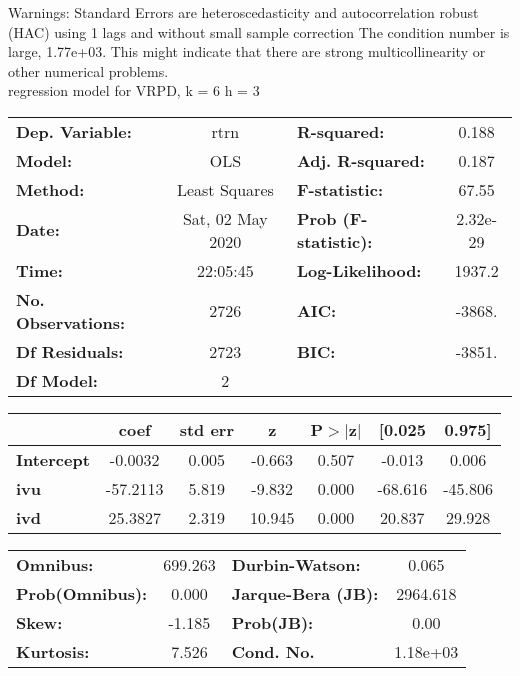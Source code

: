 Warnings: \newline
 [1] Standard Errors are heteroscedasticity and autocorrelation robust (HAC) using 1 lags and without small sample correction \newline
 [2] The condition number is large, 1.77e+03. This might indicate that there are \newline
 strong multicollinearity or other numerical problems.\\ 

regression model for VRPD, k = 6 h = 3\begin{center}
\begin{tabular}{lclc}
\toprule
\textbf{Dep. Variable:}    &       rtrn       & \textbf{  R-squared:         } &     0.188   \\
\textbf{Model:}            &       OLS        & \textbf{  Adj. R-squared:    } &     0.187   \\
\textbf{Method:}           &  Least Squares   & \textbf{  F-statistic:       } &     67.55   \\
\textbf{Date:}             & Sat, 02 May 2020 & \textbf{  Prob (F-statistic):} &  2.32e-29   \\
\textbf{Time:}             &     22:05:45     & \textbf{  Log-Likelihood:    } &    1937.2   \\
\textbf{No. Observations:} &        2726      & \textbf{  AIC:               } &    -3868.   \\
\textbf{Df Residuals:}     &        2723      & \textbf{  BIC:               } &    -3851.   \\
\textbf{Df Model:}         &           2      & \textbf{                     } &             \\
\bottomrule
\end{tabular}
\begin{tabular}{lcccccc}
                   & \textbf{coef} & \textbf{std err} & \textbf{z} & \textbf{P$> |$z$|$} & \textbf{[0.025} & \textbf{0.975]}  \\
\midrule
\textbf{Intercept} &      -0.0032  &        0.005     &    -0.663  &         0.507        &       -0.013    &        0.006     \\
\textbf{ivu}       &     -57.2113  &        5.819     &    -9.832  &         0.000        &      -68.616    &      -45.806     \\
\textbf{ivd}       &      25.3827  &        2.319     &    10.945  &         0.000        &       20.837    &       29.928     \\
\bottomrule
\end{tabular}
\begin{tabular}{lclc}
\textbf{Omnibus:}       & 699.263 & \textbf{  Durbin-Watson:     } &    0.065  \\
\textbf{Prob(Omnibus):} &   0.000 & \textbf{  Jarque-Bera (JB):  } & 2964.618  \\
\textbf{Skew:}          &  -1.185 & \textbf{  Prob(JB):          } &     0.00  \\
\textbf{Kurtosis:}      &   7.526 & \textbf{  Cond. No.          } & 1.18e+03  \\
\bottomrule
\end{tabular}
\end{center}

